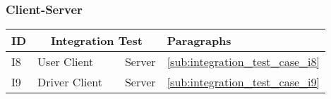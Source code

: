 \subsubsection{Client-Server} %
\label{ssub:client_server}

\begin{tabular} { p{20.0pt} | p{135pt} p{20pt} p{100pt} | p{65pt} } \hline
	\textbf{ID} & \multicolumn {3}{|c|}{\textbf{Integration Test}} & \textbf{Paragraphs} \\ \hline
	I8 & User Client & \textrightarrow & Server & \ref{sub:integration_test_case_i8} \\ \hline
	I9 & Driver Client & \textrightarrow & Server & \ref{sub:integration_test_case_i9} \\ \hline
\end{tabular}



